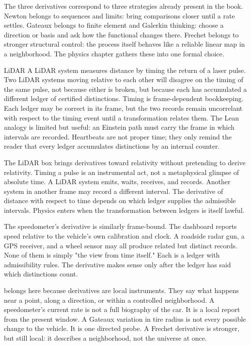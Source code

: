 The three derivatives correspond to three strategies already present in the
book. Newton belongs to sequences and limits: bring comparisons closer until a
rate settles. Gateaux belongs to finite element and Galerkin thinking: choose a
direction or basis and ask how the functional changes there. Frechet belongs to
stronger structural control: the process itself behaves like a reliable linear
map in a neighborhood. The physics chapter gathers these into one formal
choice.

\begin{gphenom}{LiDAR}
\label{ph:lidar}
\GPhObs A LiDAR system measures distance by timing the return of a laser pulse.
Two LiDAR systems moving relative to each other will disagree on the timing of
the same pulse, not because either is broken, but because each has accumulated a
different ledger of certified distinctions.
\GPhCon Timing is frame-dependent bookkeeping. Each ledger may be correct in
its frame, but the two records remain uncorrelant with respect to the timing
event until a transformation relates them.
\GPhSeq The Lean analogy is limited but useful: an Einstein path must carry the
frame in which intervals are recorded. Heartbeats are not proper time; they
only remind the reader that every ledger accumulates distinctions by an
internal counter.
\end{gphenom}

The LiDAR box brings derivatives toward relativity without pretending to
derive relativity. Timing a pulse is an instrumental act, not a metaphysical
glimpse of absolute time. A LiDAR system emits, waits, receives, and records.
Another system in another frame may record a different interval. The derivative
of distance with respect to time depends on which ledger supplies the
admissible intervals. Physics enters when the transformation between ledgers is
itself lawful.

The speedometer's derivative is similarly frame-bound. The dashboard reports
speed relative to the vehicle's own calibration and clock. A roadside radar
gun, a GPS receiver, and a wheel sensor may all produce related but distinct
records. None of them is simply "the view from time itself." Each is a ledger
with admissibility rules. The derivative makes sense only after the ledger has
said which distinctions count.

 belongs here because derivatives are local instruments. They say
what happens near a point, along a direction, or within a controlled
neighborhood. A speedometer's current rate is not a full biography of the car.
It is a local report from the present window. A Gateaux variation in tire
radius is not every possible change to the vehicle. It is one directed probe.
A Frechet derivative is stronger, but still local: it describes a neighborhood,
not the universe at once.


